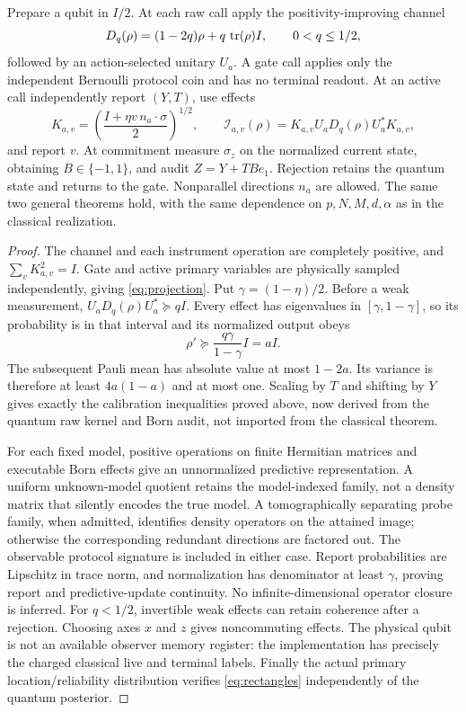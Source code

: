 \begin{theorem}\label{thm:quantum}
Prepare a qubit in $I/2$. At each raw call apply the positivity-improving channel
\[
 D_q(\rho)=(1-2q)\rho+q\,\operatorname{tr}(\rho)I,\qquad0<q\le1/2,
\]
followed by an action-selected unitary $U_a$. A gate call applies only the independent Bernoulli protocol coin and has no terminal readout. At an active call independently report $(Y,T)$, use effects
\[
 K_{a,v}=\left(\frac{I+\eta v\,n_a\cdot\sigma}{2}\right)^{1/2},\qquad
 \mathcal I_{a,v}(\rho)=K_{a,v}U_aD_q(\rho)U_a^*K_{a,v},
\]
and report $v$. At commitment measure $\sigma_z$ on the normalized current state, obtaining $B\in\{-1,1\}$, and audit $Z=Y+TB e_1$. Rejection retains the quantum state and returns to the gate. Nonparallel directions $n_a$ are allowed. The same two general theorems hold, with the same dependence on $p,N,M,d,\alpha$ as in the classical realization.
\end{theorem}
\begin{proof}
The channel and each instrument operation are completely positive, and $\sum_vK_{a,v}^2=I$. Gate and active primary variables are physically sampled independently, giving \eqref{eq:projection}. Put $\gamma=(1-\eta)/2$. Before a weak measurement, $U_aD_q(\rho)U_a^*\succeq qI$. Every effect has eigenvalues in $[\gamma,1-\gamma]$, so its probability is in that interval and its normalized output obeys
\[
 \rho'\succeq\frac{q\gamma}{1-\gamma}I=aI.
\]
The subsequent Pauli mean has absolute value at most $1-2a$. Its variance is therefore at least $4a(1-a)$ and at most one. Scaling by $T$ and shifting by $Y$ gives exactly the calibration inequalities proved above, now derived from the quantum raw kernel and Born audit, not imported from the classical theorem.

For each fixed model, positive operations on finite Hermitian matrices and executable Born effects give an unnormalized predictive representation. A uniform unknown-model quotient retains the model-indexed family, not a density matrix that silently encodes the true model. A tomographically separating probe family, when admitted, identifies density operators on the attained image; otherwise the corresponding redundant directions are factored out. The observable protocol signature is included in either case. Report probabilities are Lipschitz in trace norm, and normalization has denominator at least $\gamma$, proving report and predictive-update continuity. No infinite-dimensional operator closure is inferred. For $q<1/2$, invertible weak effects can retain coherence after a rejection. Choosing axes $x$ and $z$ gives noncommuting effects. The physical qubit is not an available observer memory register: the implementation has precisely the charged classical live and terminal labels. Finally the actual primary location/reliability distribution verifies \eqref{eq:rectangles} independently of the quantum posterior.
\end{proof}


